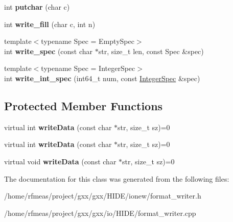 \begin{DoxyCompactItemize}
\item 
int {\bfseries putchar} (char c)\hypertarget{classgxx_1_1io_1_1format__writer_a4e4b84faa244ee84f84f9c0bf8107912}{}\label{classgxx_1_1io_1_1format__writer_a4e4b84faa244ee84f84f9c0bf8107912}

\item 
int {\bfseries write\+\_\+fill} (char c, int n)\hypertarget{classgxx_1_1io_1_1format__writer_a926d75097a61a778c425089993efb5f9}{}\label{classgxx_1_1io_1_1format__writer_a926d75097a61a778c425089993efb5f9}

\item 
{\footnotesize template$<$typename Spec  = Empty\+Spec$>$ }\\int {\bfseries write\+\_\+spec} (const char $\ast$str, size\+\_\+t len, const Spec \&spec)\hypertarget{classgxx_1_1io_1_1format__writer_a0a6b5523382a408f3e8a281f42fd9c1f}{}\label{classgxx_1_1io_1_1format__writer_a0a6b5523382a408f3e8a281f42fd9c1f}

\item 
{\footnotesize template$<$typename Spec  = Integer\+Spec$>$ }\\int {\bfseries write\+\_\+int\+\_\+spec} (int64\+\_\+t num, const \hyperlink{classgxx_1_1io_1_1IntegerSpec}{Integer\+Spec} \&spec)\hypertarget{classgxx_1_1io_1_1format__writer_ad142c2af00de5de8420250bedc2ae445}{}\label{classgxx_1_1io_1_1format__writer_ad142c2af00de5de8420250bedc2ae445}

\end{DoxyCompactItemize}
\subsection*{Protected Member Functions}
\begin{DoxyCompactItemize}
\item 
virtual int {\bfseries write\+Data} (const char $\ast$str, size\+\_\+t sz)=0\hypertarget{classgxx_1_1io_1_1format__writer_aac2244683e7925a1852a2f55ddb14ed4}{}\label{classgxx_1_1io_1_1format__writer_aac2244683e7925a1852a2f55ddb14ed4}

\item 
virtual int {\bfseries write\+Data} (const char $\ast$str, size\+\_\+t sz)=0\hypertarget{classgxx_1_1io_1_1format__writer_aac2244683e7925a1852a2f55ddb14ed4}{}\label{classgxx_1_1io_1_1format__writer_aac2244683e7925a1852a2f55ddb14ed4}

\item 
virtual void {\bfseries write\+Data} (const char $\ast$str, size\+\_\+t sz)=0\hypertarget{classgxx_1_1io_1_1format__writer_a15b0eaad39e0be8ccff9dc734a101377}{}\label{classgxx_1_1io_1_1format__writer_a15b0eaad39e0be8ccff9dc734a101377}

\end{DoxyCompactItemize}


The documentation for this class was generated from the following files\+:\begin{DoxyCompactItemize}
\item 
/home/rfmeas/project/gxx/gxx/\+H\+I\+D\+E/ionew/format\+\_\+writer.\+h\item 
/home/rfmeas/project/gxx/gxx/io/\+H\+I\+D\+E/format\+\_\+writer.\+cpp\end{DoxyCompactItemize}
